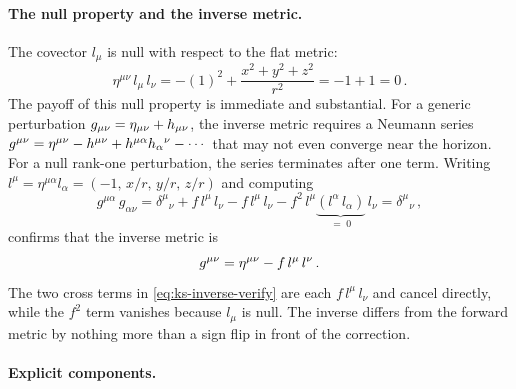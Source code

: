 \paragraph{The null property and the inverse metric.}

The covector $l_\mu$ is null with respect to the flat metric:
%
\begin{equation}
  \eta^{\mu\nu}\,l_\mu\,l_\nu = -(1)^2 + \frac{x^2 + y^2 + z^2}{r^2}
  = -1 + 1 = 0 \,.
  \label{eq:ks-flat-null}
\end{equation}
%
The payoff of this null property is immediate and substantial.  For a
generic perturbation $g_{\mu\nu} = \eta_{\mu\nu} + h_{\mu\nu}$, the inverse
metric requires a Neumann series $g^{\mu\nu} = \eta^{\mu\nu} -
h^{\mu\nu} + h^{\mu\alpha}h_\alpha{}^\nu - \cdots$ that may not even
converge near the horizon.  For a null rank-one perturbation, the series
terminates after one term.  Writing
$l^\mu = \eta^{\mu\alpha}l_\alpha = (-1,\, x/r,\, y/r,\, z/r)$ and
computing
%
\begin{equation}
  g^{\mu\alpha}\,g_{\alpha\nu}
  = \delta^\mu{}_\nu
    + f\,l^\mu\,l_\nu
    - f\,l^\mu\,l_\nu
    - f^2\,l^\mu\underbrace{(l^\alpha\,l_\alpha)}_{=\;0}\,l_\nu
  = \delta^\mu{}_\nu \,,
  \label{eq:ks-inverse-verify}
\end{equation}
%
confirms that the inverse metric is
%
\begin{equation}
  g^{\mu\nu} = \eta^{\mu\nu} - f\,l^\mu\,l^\nu \,.
  \label{eq:ks-inverse}
\end{equation}
%
The two cross terms in \cref{eq:ks-inverse-verify} are each
$f\,l^\mu\,l_\nu$ and cancel directly, while the $f^2$ term vanishes
because $l_\mu$ is null.  The inverse differs from the forward metric by
nothing more than a sign flip in front of the correction.

\paragraph{Explicit components.}

